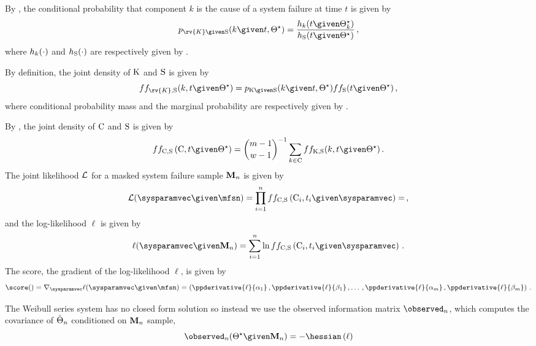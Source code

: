 \documentclass[../main.tex]{subfiles}
\begin{document}
By \Cref{}, the conditional probability that component $k$ is the cause of a system failure at time $t$ is given by
\begin{equation}
\label{eq:weibull_pmf_k_given_s}
\pmf_{\rv{K} \given \sv}(k \given t, \tparam\sysparam) = \frac
    {\haz_k(t \given \tparam\sysparam_k)}
    {\haz_{\sv}(t \given \tparam\sysparam)}\,,
\end{equation}
where $h_k(\cdot)$ and $h_{\mathrm{S}}(\cdot)$ are respectively given by .

By definition, the joint density of $\mathrm{K}$ and $\mathrm{S}$ is given by
\begin{equation}
\label{eq:weibull_joint_k_s}
\pdf{f_{\rv{K}, \sv}}( k, t \given \tparam\sysparam) =
    \pmf_{\RV{K} \given \sv}(k \given t, \tparam\sysparam) \pdf{f_{\sv}}(t \given \tparam\sysparam)\,,
\end{equation}
where conditional probability mass and the marginal probability are respectively given by .

By \Cref{}, the joint density of $\mathrm{C}$ and $\mathrm{S}$ is given by
\begin{equation}
\label{eq:weibull_joint_cand_density}
\pdf{f_{\rvcand, \sv}}\left(\cand, t \given \tparam\sysparam \right) =
    {{m-1} \choose {w-1}}^{-1} \sum_{k \in \cand} \pdf{f_{\RV{K}, \sv}}( k, t \given \tparam\sysparam)\,.
\end{equation}
The joint likelihood $\mathcal{L}$ for a masked system failure sample $\mathbf{M}_n$ is given by
\begin{equation}
\likelihood(\sysparamvec \given \mfsn) =
    \prod_{i=1}^{n} \pdf{f_{\rvcand, \sv}}\left(\cand_i, t_i \given \sysparamvec \right) =\,,
\end{equation}
and the log-likelihood $\ell$ is given by
\begin{equation}
    \ell(\sysparamvec \given \mfs) =
        \sum_{i=1}^{n} \ln \pdf{f_{\rvcand, \sv}}\left(\cand_i, t_i \given \sysparamvec \right)\,.
\end{equation}
The score, the gradient of the log-likelihood $\ell$, is given by
\begin{equation}
    \score() = \nabla_{\sysparamvec} \ell(\sysparamvec \given \mfsn) = \left (
        \ppderivative{\ell}{\alpha_1}\,,
        \ppderivative{\ell}{\beta_1}\,,
        \ldots\,,
        \ppderivative{\ell}{\alpha_m}\,,
        \ppderivative{\ell}{\beta_m}
    \right )\,.
\end{equation}


The Weibull series system has no closed form solution so instead we use the observed information matrix $\observed_n$,
which computes the covariance of $\hat{\Theta}_n$ conditioned on $\mathbf{M}_n$ sample,
\begin{equation}
\label{info_matrix_weibull}
    \observed_n(\tparam\sysparam \given \mfs) = -\hessian\left(\ell\right)
\end{equation}    
\end{document}
